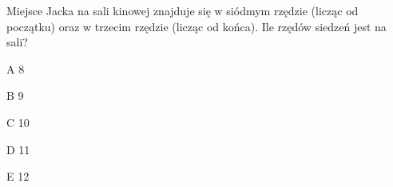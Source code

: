 \begin{tresc}
Miejsce Jacka na sali kinowej znajduje się w siódmym rzędzie (licząc od początku) oraz w trzecim rzędzie (licząc od końca). Ile rzędów siedzeń jest na sali?
\end{tresc}
\begin{wariant}{A} 8 \end{wariant}
\begin{wariant}{B} 9 \end{wariant}
\begin{wariant}{C} 10 \end{wariant}
\begin{wariant}{D} 11 \end{wariant}
\begin{wariant}{E} 12 \end{wariant}
